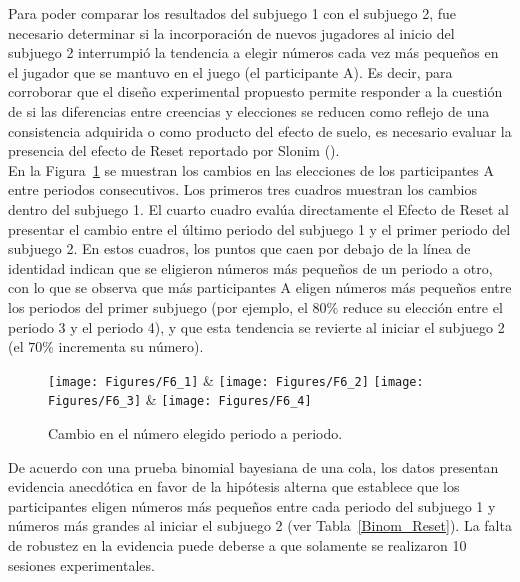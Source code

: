Para poder comparar los resultados del subjuego 1 con el subjuego 2, fue necesario determinar si la incorporación de nuevos jugadores al inicio del subjuego 2 interrumpió la tendencia a elegir números cada vez más pequeños en el jugador que se mantuvo en el juego (el participante A). Es decir, para corroborar que el diseño experimental propuesto permite responder a la cuestión de si las diferencias entre creencias y elecciones se reducen como reflejo de una consistencia adquirida o como producto del efecto de suelo, es necesario evaluar la presencia del efecto de Reset reportado por Slonim (\citeyear{Slonim}).\\

En la Figura~\ref{fig:Reset_cambios} se muestran los cambios en las elecciones de los participantes A entre periodos consecutivos. Los primeros tres cuadros muestran los cambios dentro del subjuego 1.  El cuarto cuadro  evalúa directamente el Efecto de Reset al presentar el cambio entre el último periodo del subjuego 1 y el primer periodo del subjuego 2. En estos cuadros, los puntos que caen por debajo de la línea de identidad indican que se eligieron números más pequeños de un periodo a otro, con lo que se observa que más participantes A eligen números más pequeños entre los periodos del primer subjuego (por ejemplo, el $80\%$ reduce su elección entre el periodo 3 y el periodo 4), y que esta tendencia se revierte al iniciar el subjuego 2 (el $70\%$ incrementa su número).\\

\begin{figure}[hp]
\centering
\texttt{[image: Figures/F6\_1]} & \texttt{[image: Figures/F6\_2]} 
\texttt{[image: Figures/F6\_3]} & \texttt{[image: Figures/F6\_4]} 
\decoRule
\caption[Evaluación de las Diferencias Relativas entre creencias y elecciones en el Subjuego 1 sin la multiplicación por p (Factor de Bayes)]{Cambio en el número elegido periodo a periodo.}
\label{fig:Reset_cambios}
\end{figure}

De acuerdo con una prueba binomial bayesiana de una cola, los datos presentan evidencia anecdótica en favor de la hipótesis alterna que establece que los participantes eligen números más pequeños entre cada periodo del subjuego 1 y números más grandes al iniciar el subjuego 2 (ver Tabla~\ref{Binom_Reset}). La falta de robustez en la evidencia puede deberse a que solamente se realizaron 10 sesiones experimentales.\\

